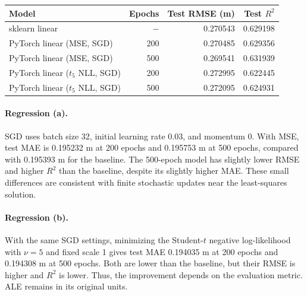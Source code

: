 \documentclass[11pt,a4paper]{article}
\begin{document}
\begin{center}
  \begin{tabular}{lrrr}
    \hline
    Model & Epochs & Test RMSE (m) & Test $R^2$ \\
    \hline
    sklearn linear & $-$ & 0.270543 & 0.629198 \\
    PyTorch linear (MSE, SGD) & 200 & 0.270485 & 0.629356 \\
    PyTorch linear (MSE, SGD) & 500 & 0.269541 & 0.631939 \\
    PyTorch linear ($t_5$ NLL, SGD) & 200 & 0.272995 & 0.622445 \\
    PyTorch linear ($t_5$ NLL, SGD) & 500 & 0.272095 & 0.624931 \\
    \hline
  \end{tabular}
\end{center}

\paragraph{Regression (a).} SGD uses batch size 32, initial learning rate 0.03, and momentum 0. With MSE, test MAE is 0.195232 m at 200 epochs and 0.195753 m at 500 epochs, compared with 0.195393 m for the baseline. The 500-epoch model has slightly lower RMSE and higher $R^2$ than the baseline, despite its slightly higher MAE. These small differences are consistent with finite stochastic updates near the least-squares solution.

\paragraph{Regression (b).} With the same SGD settings, minimizing the Student-$t$ negative log-likelihood with $\nu=5$ and fixed scale 1 gives test MAE 0.194035 m at 200 epochs and 0.194308 m at 500 epochs. Both are lower than the baseline, but their RMSE is higher and $R^2$ is lower. Thus, the improvement depends on the evaluation metric. ALE remains in its original units.
\end{document}
